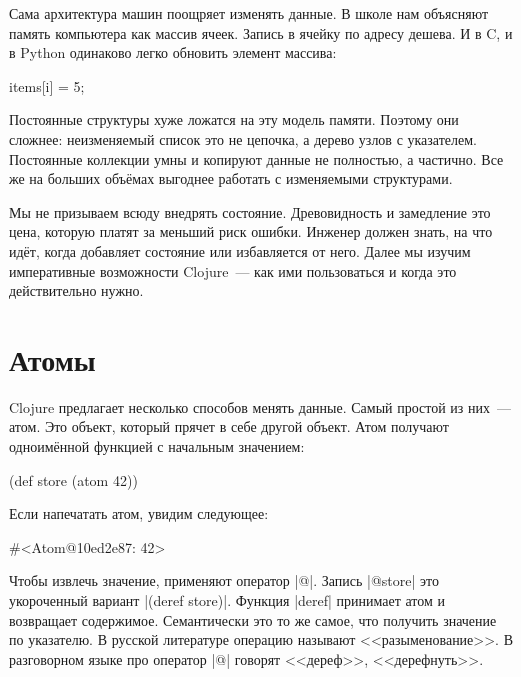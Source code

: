 Сама архитектура машин поощряет изменять данные. В школе нам объясняют память
компьютера как массив ячеек. Запись в ячейку по адресу дешева. И в C\Plus\Plus,
и в Python одинаково легко обновить элемент массива:

\begin{english}
  \begin{python}
items[i] = 5;
  \end{python}
\end{english}

Постоянные структуры хуже ложатся на эту модель памяти. Поэтому они сложнее:
неизменяемый список это не цепочка, а дерево узлов с указателем. Постоянные
коллекции умны и копируют данные не полностью, а частично. Все же на больших
объ\"{е}мах выгоднее работать с изменяемыми структурами.

Мы не призываем всюду внедрять состояние. Древовидность и замедление это цена,
которую платят за меньший риск ошибки. Инженер должен знать, на что ид\"{е}т, когда
добавляет состояние или избавляется от него. Далее мы изучим императивные
возможности Clojure~--- как ими пользоваться и когда это действительно нужно.

\section{Атомы}


Clojure предлагает несколько способов менять данные. Самый простой из них~---
атом. Это объект, который прячет в себе другой объект. Атом получают одноим\"{е}нной
функцией с начальным значением:

\begin{english}
  \begin{clojure}
(def store (atom 42))
  \end{clojure}
\end{english}

\noindent
Если напечатать атом, увидим следующее:

\begin{english}
  \begin{clojure}
#<Atom@10ed2e87: 42>
  \end{clojure}
\end{english}

Чтобы извлечь значение, применяют оператор \spverb|@|. Запись \spverb|@store|
это укороченный вариант \spverb|(deref store)|. Функция \spverb|deref| принимает
атом и возвращает содержимое. Семантически это то же самое, что получить
значение по указателю. В русской литературе операцию называют
<<разыменование>>. В разговорном языке про оператор \spverb|@| говорят
<<дереф>>, <<дерефнуть>>.

